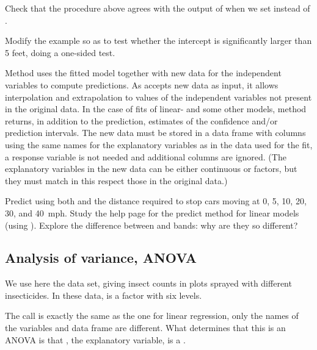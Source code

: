 \documentclass[krantz2]{krantz}\usepackage{knitr}
\begin{document}
\begin{advplayground}
Check that the procedure above agrees with the output of  when we set  instead of .

Modify the example so as to test whether the intercept is significantly larger than 5 feet, doing a one-sided test.
\end{advplayground}

Method  uses the fitted model together with new data for the independent variables to compute predictions. As  accepts new data as input, it allows interpolation and extrapolation to values of the independent variables not present in the original data. In the case of fits of linear- and some other models, method  returns, in addition to the prediction, estimates of the confidence and/or prediction intervals. The new data must be stored in a data frame with columns using the same names for the explanatory variables as in the data used for the fit, a response variable is not needed and additional columns are ignored. (The explanatory variables in the new data can be either continuous or factors, but they must match in this respect those in the original data.)

\begin{advplayground}
Predict using both  and  the distance required to stop cars moving at 0, 5, 10, 20, 30, and 40~mph. Study the help page for the predict method for linear models (using ). Explore the difference between  and  bands: why are they so different?
\end{advplayground}

\subsection{Analysis of variance, ANOVA}\label{sec:anova}
We use here the  data set, giving insect counts in plots sprayed with different insecticides. In these data,  is a factor with six levels.%
\label{xmpl:fun:lm:fm4}

The call is exactly the same as the one for linear regression, only the names of the variables and data frame are different. What determines that this is an ANOVA is that , the explanatory variable, is a .
\end{document}
